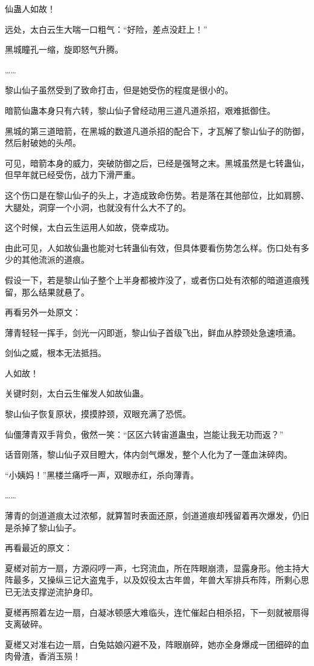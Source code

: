 \begin{this_body}
仙蛊人如故！

远处，太白云生大喘一口粗气：“好险，差点没赶上！”

黑城瞳孔一缩，旋即怒气升腾。

……

黎山仙子虽然受到了致命打击，但是她受伤的程度是很小的。

暗箭仙蛊本身只有六转，黎山仙子曾经动用三道凡道杀招，艰难抵御住。

黑城的第三道暗箭，在黑城的数道凡道杀招的配合下，才瓦解了黎山仙子的防御，然后射破她的头颅。

可见，暗箭本身的威力，突破防御之后，已经是强弩之末。黑城虽然是七转蛊仙，但早年就已经受伤，战力下滑严重。

这个伤口是在黎山仙子的头上，才造成致命伤势。若是落在其他部位，比如肩膀、大腿处，洞穿一个小洞，也就没有什么大不了的。

这个时候，太白云生运用人如故，侥幸成功。

由此可见，人如故仙蛊也能对七转蛊仙有效，但具体要看伤势怎么样。伤口处有多少的其他流派的道痕。

假设一下，若是黎山仙子整个上半身都被炸没了，或者伤口处有浓郁的暗道道痕残留，那么结果就悬了。

再看另外一处原文：

薄青轻轻一挥手，剑光一闪即逝，黎山仙子首级飞出，鲜血从脖颈处急速喷涌。

剑仙之威，根本无法抵挡。

人如故！

关键时刻，太白云生催发人如故仙蛊。

黎山仙子恢复原状，摸摸脖颈，双眼充满了恐慌。

仙僵薄青双手背负，傲然一笑：“区区六转宙道蛊虫，岂能让我无功而返？”

话音刚落，黎山仙子双目瞪大，体内剑气爆发，整个人化为了一蓬血沫碎肉。

“小姨妈！”黑楼兰痛呼一声，双眼赤红，杀向薄青。

……

薄青的剑道道痕太过浓郁，就算暂时表面还原，剑道道痕却残留着再次爆发，仍旧是杀掉了黎山仙子。

再看最近的原文：

夏槎对前方一扇，方源闷哼一声，七窍流血，所在阵眼崩溃，显露身形。他主持大阵最多，又操纵三记大盗鬼手，以及奴役太古年兽，年兽大军排兵布阵，所剩心思已无法支撑逆流护身印。

夏槎再照着左边一扇，白凝冰顿感大难临头，连忙催起白相杀招，下一刻就被扇得支离破碎。

夏槎又对准右边一扇，白兔姑娘闪避不及，阵眼崩碎，她亦全身爆成一团细碎的血肉骨渣，香消玉殒！


\end{this_body}
